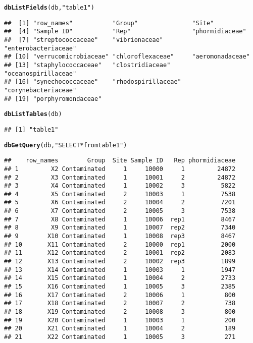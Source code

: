 \documentclass[12pt]{beamer}\usepackage[]{graphicx}\usepackage[]{color}
\makeatletter
\newcommand{\hlstr}[1]{\textcolor[rgb]{0.192,0.494,0.8}{#1}}%
\newcommand{\hlstd}[1]{\textcolor[rgb]{0.345,0.345,0.345}{#1}}%
\newcommand{\hlkwd}[1]{\textcolor[rgb]{0.737,0.353,0.396}{\textbf{#1}}}%
\newenvironment{kframe}{%
 \def\at@end@of@kframe{}%
 \ifinner\ifhmode%
  \def\at@end@of@kframe{\end{minipage}}%
  \begin{minipage}{\columnwidth}%
 \fi\fi%
 \def\FrameCommand##1{\hskip\@totalleftmargin \hskip-\fboxsep
 \colorbox{shadecolor}{##1}\hskip-\fboxsep
     \hskip-\linewidth \hskip-\@totalleftmargin \hskip\columnwidth}%
 \MakeFramed {\advance\hsize-\width
   \@totalleftmargin\z@ \linewidth\hsize
   \@setminipage}}%
 {\par\unskip\endMakeFramed%
 \at@end@of@kframe}
\newenvironment{knitrout}{}{} %
\makeatother
\begin{document}
\begin{frame}[fragile]
\begin{knitrout}
\begin{kframe}
\begin{alltt}
\hlkwd{dbListFields}\hlstd{(db,}\hlstr{"table1"}\hlstd{)}
\end{alltt}
\begin{verbatim}
##  [1] "row_names"           "Group"               "Site"               
##  [4] "Sample ID"           "Rep"                 "phormidiaceae"      
##  [7] "streptococcaceae"    "vibrionaceae"        "enterobacteriaceae" 
## [10] "verrucomicrobiaceae" "chloroflexaceae"     "aeromonadaceae"     
## [13] "staphylococcaceae"   "clostridiaceae"      "oceanospirillaceae" 
## [16] "synechococcaceae"    "rhodospirillaceae"   "corynebacteriaceae" 
## [19] "porphyromondaceae"
\end{verbatim}
\begin{alltt}
\hlkwd{dbListTables}\hlstd{(db)}
\end{alltt}
\begin{verbatim}
## [1] "table1"
\end{verbatim}
\begin{alltt}
\hlkwd{dbGetQuery}\hlstd{(db,} \hlstr{"SELECT * from table1"}\hlstd{)}
\end{alltt}
\begin{verbatim}
##    row_names        Group  Site Sample ID   Rep phormidiaceae
## 1         X2 Contaminated     1     10000     1         24872
## 2         X3 Contaminated     1     10001     2         24872
## 3         X4 Contaminated     1     10002     3          5822
## 4         X5 Contaminated     2     10003     1          7538
## 5         X6 Contaminated     2     10004     2          7201
## 6         X7 Contaminated     2     10005     3          7538
## 7         X8 Contaminated     1     10006  rep1          8467
## 8         X9 Contaminated     1     10007  rep2          7340
## 9        X10 Contaminated     1     10008  rep3          8467
## 10       X11 Contaminated     2     10000  rep1          2000
## 11       X12 Contaminated     2     10001  rep2          2083
## 12       X13 Contaminated     2     10002  rep3          1899
## 13       X14 Contaminated     1     10003     1          1947
## 14       X15 Contaminated     1     10004     2          2733
## 15       X16 Contaminated     1     10005     3          2385
## 16       X17 Contaminated     2     10006     1           800
## 17       X18 Contaminated     2     10007     2           738
## 18       X19 Contaminated     2     10008     3           800
## 19       X20 Contaminated     1     10003     1           200
## 20       X21 Contaminated     1     10004     2           189
## 21       X22 Contaminated     1     10005     3           271

\end{verbatim}
\end{kframe}
\end{knitrout}
\end{frame}
\end{document}
